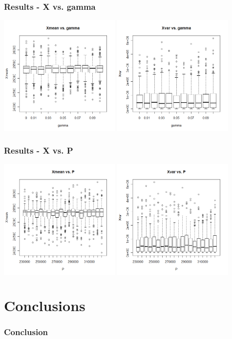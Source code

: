 \begin{frame}
    \frametitle{Results - X vs. gamma }
\hspace*{-5mm}
\includegraphics[height=6cm]{boxplot500_xmean_gamma}
\includegraphics[height=6cm]{boxplot500_xvar_gamma}
\end{frame}

\begin{frame}
    \frametitle{Results - X vs. P }
\hspace*{-5mm}
\includegraphics[height=6cm]{boxplot500_xmean_P}
\includegraphics[height=6cm]{boxplot500_xvar_P}
\end{frame}





\section{Conclusions}

\begin{frame}
    \frametitle{Conclusion}
\end{frame}




